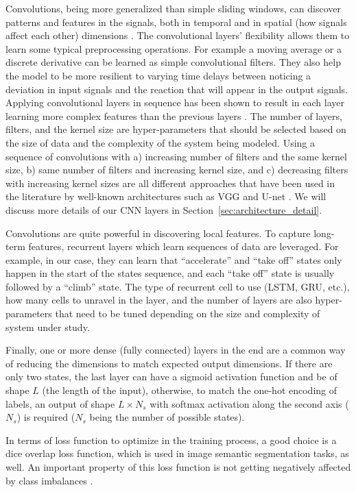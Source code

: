 Convolutions, being more generalized than simple sliding windows, can discover patterns and features in the signals, both in temporal and in spatial (how signals affect each other) dimensions \cite{wang2017time}. 
The convolutional layers' flexibility allows them to learn some typical preprocessing operations. For example a moving average or a discrete derivative can be learned as simple convolutional filters. They also help the model to be more resilient to varying time delays between noticing a deviation in input signals and the reaction that will appear in the output signals. Applying convolutional layers in sequence has been shown to result in each layer learning more complex features than the previous layers \cite{zeiler2014visualizing}.
The number of layers, filters, and the kernel size are hyper-parameters that should be selected based on the size of data and the complexity of the system being modeled.
Using a sequence of convolutions with a) increasing number of filters and the same kernel size, b) same number of filters and increasing kernel size, and c) decreasing filters with increasing kernel sizes are all different approaches that have been used in the literature by well-known architectures such as VGG and U-net \cite{simonyan2014very, ronneberger2015u}. We will discuss more details of our CNN layers in Section~\ref{sec:architecture_detail}.

Convolutions are quite powerful in discovering local features. To capture long-term features, recurrent layers which learn sequences of data are leveraged. For example, in our case, they can learn that ``accelerate'' and ``take off'' states only happen in the start of the states sequence, and each ``take off'' state is usually followed by a ``climb'' state. The type of recurrent cell to use (LSTM, GRU, etc.), how many cells to unravel in the layer, and the number of layers are also hyper-parameters that need to be tuned depending on the size and complexity of system under study.

Finally, one or more dense (fully connected) layers in the end are a common way of reducing the dimensions to match expected output dimensions. 
If there are only two states, the last layer can have a sigmoid activation function and be of shape $L$ (the length of the input), otherwise, to match the one-hot encoding of labels, an output of shape $L\times N_s$ with softmax activation along the second axis ($N_s$) is required ($N_s$ being the number of possible states).

In terms of loss function to optimize in the training process, a good choice is a dice overlap loss function, which is used in image semantic segmentation tasks, as well. An important property of this loss function is not getting negatively affected by class imbalances \cite{milletari2016v, sudre2017generalised}.

